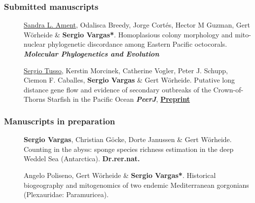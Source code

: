 \documentclass[letter,10pt]{article}
\begin{document}
\subsubsection*{Submitted manuscripts}%
\begin{description}
\item[]\underline{Sandra L. Ament}, Odalisca Breedy, Jorge Cort\'es, Hector M Guzman, Gert W\"orheide \& \textbf{Sergio Vargas*}. Homoplasious colony morphology and mito-nuclear phylogenetic discordance among Eastern Pacific octocorals. \textbf{\emph{Molecular Phylogenetics and Evolution}}

\item[]\underline{Sergio Tusso}, Kerstin Morcinek, Catherine Vogler, Peter J. Schupp,  Ciemon F. Caballes, \textbf{Sergio Vargas} \& Gert W\"orheide. Putative long distance gene flow and evidence of secondary outbreaks of the Crown-of-Thorns Starfish in the Pacific Ocean \textbf{\emph{PeerJ}}, \hfill\textbf{{\scriptsize \href{https://peerj.com/preprints/1167v1/}{Preprint}}}

\end{description}

\subsubsection*{Manuscripts in preparation}
\begin{description}

\item[]\textbf{Sergio Vargas}, Christian G\"ocke, Dorte Janussen \& Gert W\"orheide. Counting in the abyss: sponge species richness estimation in the deep Weddel Sea (Antarctica). \hfill\textbf{{\scriptsize Dr.rer.nat.}}

\item[]Angelo Poliseno, Gert W\"orheide \& \textbf{Sergio Vargas*}. Historical biogeography and mitogenomics of two endemic Mediterranean gorgonians (Plexauridae: Paramuricea).

\end{description}
\end{document}
